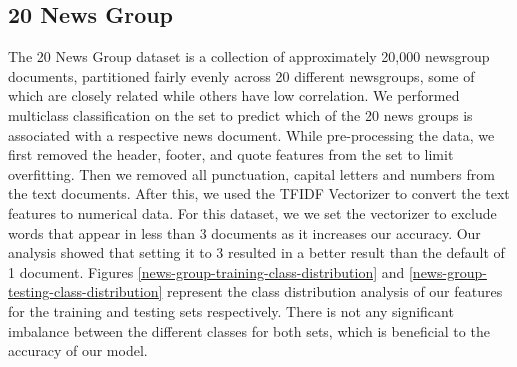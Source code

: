 \documentclass{homework}
\begin{document}
\subsection{20 News Group}
The 20 News Group dataset is a collection of approximately 20,000 newsgroup documents, partitioned fairly evenly across 20 different newsgroups, some of which are closely related while others have low correlation. We performed multiclass classification on the set to predict which of the 20 news groups is associated with a respective news document. While pre-processing the data, we first removed the header, footer, and quote features from the set to limit overfitting. Then we removed all punctuation, capital letters and numbers from the text documents. After this, we used the TFIDF Vectorizer to convert the text features to numerical data. For this dataset, we we set the vectorizer to exclude words that appear in less than 3 documents as it increases our accuracy. Our analysis showed that setting it to 3 resulted in a better result than the default of 1 document. Figures \ref{news-group-training-class-distribution} and \ref{news-group-testing-class-distribution} represent the class distribution analysis of our features for the training and testing sets respectively. There is not any significant imbalance between the different classes for both sets, which is beneficial to the accuracy of our model.
\end{document}
